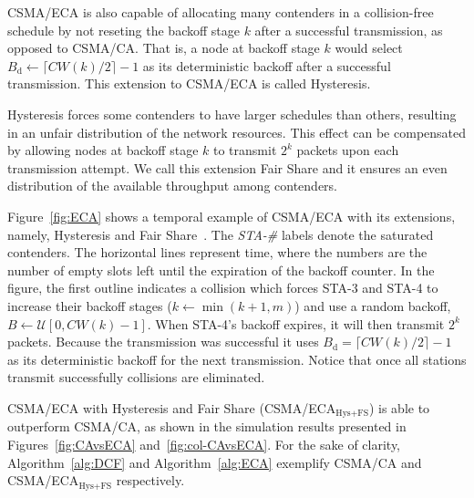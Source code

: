 CSMA/ECA is also capable of allocating many contenders in a collision-free schedule by not reseting the backoff stage $k$ after a successful transmission, as opposed to CSMA/CA. That is, a node at backoff stage $k$ would select $B_{\text{d}}\leftarrow \lceil CW(k)/2\rceil-1$ as its deterministic backoff after a successful transmission. This extension to CSMA/ECA is called Hysteresis. 

Hysteresis forces some contenders to have larger schedules than others, resulting in an unfair distribution of the network resources. This effect can be compensated by allowing nodes at backoff stage $k$ to transmit $2^{k}$ packets upon each transmission attempt. We call this extension Fair Share and it ensures an even distribution of the available throughput among contenders.

Figure~\ref{fig:ECA} shows a temporal example of CSMA/ECA with its extensions, namely, Hysteresis and Fair Share~\cite{sanabria2014high}. The \emph{STA-\#} labels denote the saturated contenders. The horizontal lines represent time, where the numbers are the number of empty slots left until the expiration of the backoff counter. In the figure, the first outline indicates a collision which forces STA-3 and STA-4 to increase their backoff stages ($k \leftarrow \min(k+1,m)$) and use a random backoff, $B\leftarrow\mathcal{U}[0,CW(k)-1]$. When STA-4's backoff expires, it will then transmit $2^{k}$ packets. Because the transmission was successful it uses $B_{\text{d}}=\lceil CW(k)/2\rceil-1$ as its deterministic backoff for the next transmission. Notice that once all stations transmit successfully collisions are eliminated.

CSMA/ECA with Hysteresis and Fair Share (CSMA/ECA$_{\text{Hys+FS}}$) is able to outperform CSMA/CA, as shown in the simulation results presented in Figures~\ref{fig:CAvsECA} and~\ref{fig:col-CAvsECA}. For the sake of clarity, Algorithm~\ref{alg:DCF} and Algorithm~\ref{alg:ECA} exemplify CSMA/CA and CSMA/ECA$_{\text{Hys+FS}}$ respectively.

